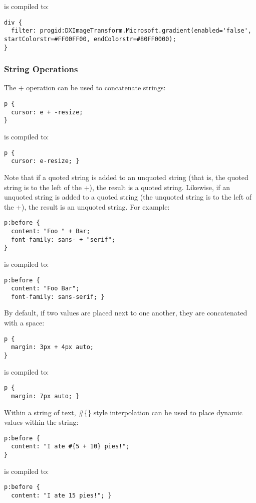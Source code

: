 \documentclass[9pt]{article}
\begin{document}
 is compiled to:
\begin{verbatim}
div {
  filter: progid:DXImageTransform.Microsoft.gradient(enabled='false', startColorstr=#FF00FF00, endColorstr=#80FF0000);
}
\end{verbatim}
\subsubsection{String Operations}


 The + operation can be used to concatenate strings:
\begin{verbatim}
p {
  cursor: e + -resize;
}
\end{verbatim}


 is compiled to:
\begin{verbatim}
p {
  cursor: e-resize; }
\end{verbatim}


 Note that if a quoted string is added to an unquoted string (that is, the quoted string is to the left of the +), the result is a quoted string. Likewise, if an unquoted string is added to a quoted string (the unquoted string is to the left of the +), the result is an unquoted string. For example:
\begin{verbatim}
p:before {
  content: "Foo " + Bar;
  font-family: sans- + "serif";
}
\end{verbatim}


 is compiled to:
\begin{verbatim}
p:before {
  content: "Foo Bar";
  font-family: sans-serif; }
\end{verbatim}


 By default, if two values are placed next to one another, they are concatenated with a space:
\begin{verbatim}
p {
  margin: 3px + 4px auto;
}
\end{verbatim}


 is compiled to:
\begin{verbatim}
p {
  margin: 7px auto; }
\end{verbatim}


 Within a string of text, \#\{\} style interpolation can be used to place dynamic values within the string:
\begin{verbatim}
p:before {
  content: "I ate #{5 + 10} pies!";
}
\end{verbatim}


 is compiled to:
\begin{verbatim}
p:before {
  content: "I ate 15 pies!"; }
\end{verbatim}
\end{document}
